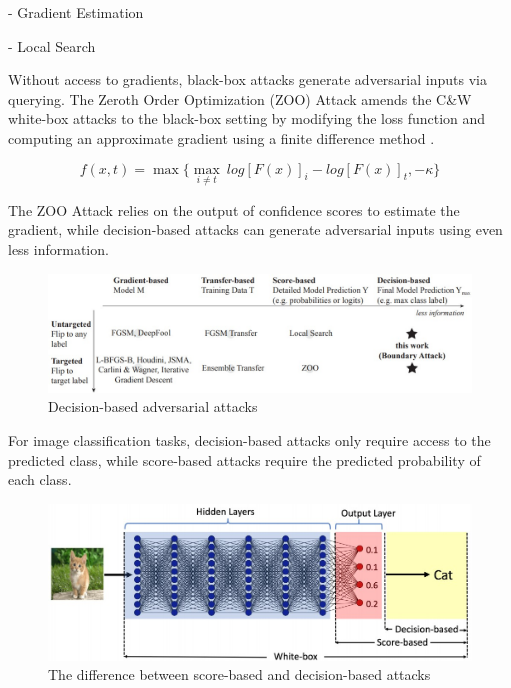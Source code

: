 - Gradient Estimation

- Local Search

Without access to gradients, black-box attacks generate adversarial inputs via querying. The Zeroth Order Optimization (ZOO) Attack amends the C\&W white-box attacks to the black-box setting by modifying the loss function and computing an approximate gradient using a finite difference method \citep{Chen_2017}.

$$f(x,t) = \max \{ {\underset{i \neq t}{\max}\ log[F(x)]_i - log[F(x)]_t, -\kappa } \}$$

The ZOO Attack relies on the output of confidence scores to estimate the gradient, while decision-based attacks can generate adversarial inputs using even less information.

\begin{figure}[H]
\centering
\includegraphics[scale=0.45]{figures/chapter_intro/query-efficient.jpg}
\caption{Decision-based adversarial attacks \citep{brendel2018decisionbased}}
\label{fig.query}
\end{figure}

For image classification tasks, decision-based attacks only require access to the predicted class, while score-based attacks require the predicted probability of each class.

\begin{figure}[H]
\centering
\includegraphics[scale=0.35]{figures/chapter_intro/score-decision.jpg}
\caption{The difference between score-based and decision-based attacks \citep{chen2020hopskipjumpattack}}
\label{fig.decision}
\end{figure}

